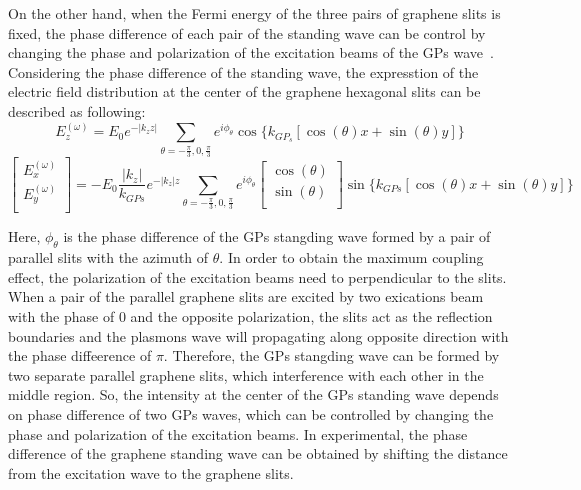 \documentclass{optica-article}
\begin{document}
On the other hand, when the Fermi energy of the three pairs of graphene slits is fixed, the phase difference of each pair of the standing wave can be control by changing the phase and polarization of the excitation beams of the GPs wave~\cite{RN13, RN15}. Considering the phase difference of the standing wave, the expresstion of the electric field distribution at the center of the graphene hexagonal slits can be described as following:
 \begin{equation}
E_{z}^{(\omega)}=E_{0}e^{-{\left|{k_{z}z}\right|}}{\sum_{\theta=-{\frac{\pi}{3}},{0},{\frac{\pi}{3}}}}{e^{i\phi_{\theta}}}{\cos\{k_{GP_{s}}[\cos{(\theta)x}+\sin{(\theta)}y]\}} 
\label{eqn6}
\end{equation}
\begin{equation}
\left[
\begin{array}{cc}
E_{x}^{(\omega)} \\
E_{y}^{(\omega)} \\
\end{array}
\right]=-E_{0}\frac{\left|{k_{z}}\right|}{k_{GPs}}e^{-\left|{k_{z}}\right|z}{\sum_{\theta=-\frac{\pi}{3},0,\frac{\pi}{3}}}{e^{i\phi_{\theta}}}
\left[
\begin{array}{cc}
\cos(\theta) \\
\sin(\theta) \\
\end{array}
\right]
\sin\{k_{GPs}[\cos(\theta)x+\sin(\theta)y]\}
\label{eqn7}
\end{equation}
 
Here, $\phi_{\theta}$ is the phase difference of the GPs stangding wave formed by a pair of parallel slits with the azimuth of $\theta$. In order to obtain the maximum coupling effect, the polarization of the excitation beams need to perpendicular to the slits. When a pair of the parallel graphene slits are excited by two exications beam with the phase of 0 and the opposite polarization, the slits act as the reflection boundaries and the plasmons wave will propagating along opposite direction with the phase diffeerence of $\pi$. Therefore, the GPs stangding wave can be formed by two separate parallel graphene slits, which interference with each other in the middle region. So, the intensity at the center of the GPs standing wave depends on phase difference of two GPs waves, which can be controlled by changing the phase and polarization of the excitation beams. In experimental, the phase difference of the graphene standing wave can be obtained by shifting the distance from the excitation wave to the graphene slits. 
\end{document}
